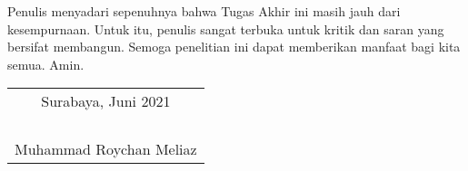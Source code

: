 Penulis menyadari sepenuhnya bahwa Tugas Akhir ini masih jauh dari kesempurnaan. Untuk itu, penulis sangat terbuka untuk kritik dan saran yang bersifat membangun. Semoga penelitian ini dapat memberikan manfaat bagi kita semua. Amin.

\begin{flushright}
  \begin{tabular}[b]{c}
    Surabaya, Juni 2021\\
    \\
    \\
    \\
    \\
    Muhammad Roychan Meliaz
  \end{tabular}
\end{flushright}
